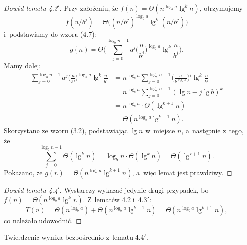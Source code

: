 \begin{proof}[Dowód lematu 4.3\/$'$]
	Przy założeniu, że $f(n)=\Theta(n^{\log_ba}\lg^kn)$, otrzymujemy
	\[
		f(n/b^j)=\Theta\bigl((n/b^j)^{\log_ba}\lg^k(n/b^j)\bigr)
	\]
	i~podstawiamy do wzoru (4.7):
	\[
		g(n) = \Theta\biggl(\sum_{j=0}^{\log_bn-1}a^j\biggl(\frac{n}{b^j}\biggr)^{\log_ba}\lg^k\frac{n}{b^j}\biggr).
	\]
	Mamy dalej:
	\begin{align*}
		\sum_{j=0}^{\log_bn-1}a^j\biggl(\frac{n}{b^j}\biggr)^{\log_ba}\lg^k\frac{n}{b^j} &= n^{\log_ba}\sum_{j=0}^{\log_bn-1}\biggl(\frac{a}{b^{\log_ba}}\biggr)^j\lg^k\frac{n}{b^j} \\
		&= n^{\log_ba}\sum_{j=0}^{\log_bn-1}(\lg n-j\lg b)^k \\
		&= n^{\log_ba}\cdot\Theta(\lg^{k+1}n) \\[1mm]
		&= \Theta(n^{\log_ba}\lg^{k+1}n).
	\end{align*}
	Skorzystano ze wzoru (3.2), podstawiając $\lg n$ w~miejsce $n$, a~następnie z~tego, że
	\[
		\sum_{j=0}^{\log_bn-1}\Theta(\lg^kn) = \log_bn\cdot\Theta(\lg^kn) = \Theta(\lg^{k+1}n).
	\]
	Pokazano, że $g(n)=\Theta(n^{\log_ba}\lg^{k+1}n)$, a~więc lemat jest prawdziwy.
\end{proof}

\begin{proof}[Dowód lematu 4.4\/$'$]
	Wystarczy wykazać jedynie drugi przypadek, bo $f(n)=\Theta(n^{\log_ba}\lg^kn)$.
Z~lematów 4.2 i~4.3$'$:
	\[
		T(n) = \Theta(n^{\log_ba})+\Theta(n^{\log_ba}\lg^{k+1}n) = \Theta(n^{\log_ba}\lg^{k+1}n),
	\]
	co należało udowodnić.
\end{proof}

Twierdzenie wynika bezpośrednio z~lematu 4.4$'$.

\exercise %


